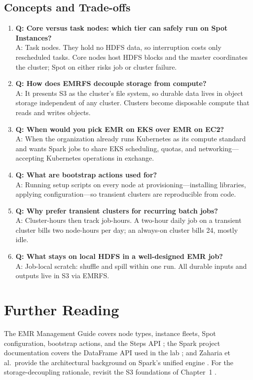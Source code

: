 \subsection{Concepts and Trade-offs}
\begin{enumerate}
    \item \textbf{Q: Core versus task nodes: which tier can safely run on Spot Instances?}\\
    A: Task nodes. They hold no HDFS data, so interruption costs only rescheduled tasks. Core nodes host HDFS blocks and the master coordinates the cluster; Spot on either risks job or cluster failure.
    \item \textbf{Q: How does EMRFS decouple storage from compute?}\\
    A: It presents S3 as the cluster's file system, so durable data lives in object storage independent of any cluster. Clusters become disposable compute that reads and writes objects.
    \item \textbf{Q: When would you pick EMR on EKS over EMR on EC2?}\\
    A: When the organization already runs Kubernetes as its compute standard and wants Spark jobs to share EKS scheduling, quotas, and networking---accepting Kubernetes operations in exchange.
    \item \textbf{Q: What are bootstrap actions used for?}\\
    A: Running setup scripts on every node at provisioning---installing libraries, applying configuration---so transient clusters are reproducible from code.
    \item \textbf{Q: Why prefer transient clusters for recurring batch jobs?}\\
    A: Cluster-hours then track job-hours. A two-hour daily job on a transient cluster bills two node-hours per day; an always-on cluster bills 24, mostly idle.
    \item \textbf{Q: What stays on local HDFS in a well-designed EMR job?}\\
    A: Job-local scratch: shuffle and spill within one run. All durable inputs and outputs live in S3 via EMRFS.
\end{enumerate}

\section{Further Reading}
The EMR Management Guide covers node types, instance fleets, Spot configuration, bootstrap actions, and the Steps API \cite{awsEMRDocs}; the Spark project documentation covers the DataFrame API used in the lab \cite{apacheSparkProject}; and Zaharia et al.\ provide the architectural background on Spark's unified engine \cite{zaharia2016apache}. For the storage-decoupling rationale, revisit the S3 foundations of Chapter~1 \cite{awsS3UserGuide}.

